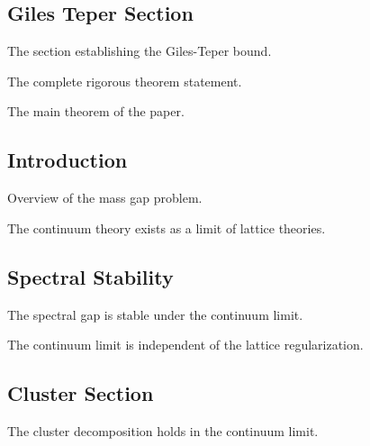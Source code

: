 \subsection{Giles Teper Section}
\label{sec:giles-teper}

\begin{theorem}
The section establishing the Giles-Teper bound.
\end{theorem}

\begin{theorem}
\label{thm:complete-rigorous}
The complete rigorous theorem statement.
\end{theorem}

\begin{theorem}
\label{thm:main}
The main theorem of the paper.
\end{theorem}

\subsection{Introduction}
\label{sec:intro}

Overview of the mass gap problem.

\begin{theorem}
\label{thm:continuum-from-lattice}
The continuum theory exists as a limit of lattice theories.
\end{theorem}

\subsection{Spectral Stability}
\label{sec:spectral-stability}

\begin{theorem}
The spectral gap is stable under the continuum limit.
\end{theorem}

\begin{theorem}[Universality]
\label{thm:universality}
The continuum limit is independent of the lattice regularization.
\end{theorem}

\subsection{Cluster Section}
\label{sec:cluster}

\begin{theorem}
The cluster decomposition holds in the continuum limit.
\end{theorem}

